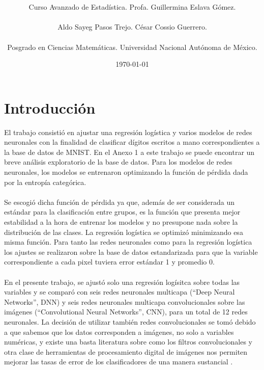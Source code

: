 \documentclass[11pt]{article}
\title{\textbf{\work}}
\author{Curso Avanzado de Estadística. Profa. Guillermina Eslava Gómez.\\ \\ Aldo Sayeg Pasos Trejo. César Cossio Guerrero. \\ \\ Posgrado en Ciencias Matemáticas. Universidad Nacional Autónoma de México. }
\date{\today}
\begin{document}
\maketitle
\section{Introducción}
El trabajo consistió en ajustar una regresión logística y varios modelos de redes neuronales con la finalidad de clasificar dígitos escritos a mano correspondientes a la base de datos de MNIST. En el Anexo 1 a este trabajo se puede encontrar un breve análisis exploratorio de la base de datos. Para los modelos de redes neuronales, los modelos se entrenaron optimizando la función de pérdida dada por la entropía categórica. %
\\
\\Se escogió dicha función de pérdida ya que, además de ser considerada un estándar para la clasificación entre grupos, es la función que presenta mejor estabilidad a la hora de entrenar los modelos y no presupone nada sobre la distribución de las clases. La regresión logística se optimizó minimizando esa misma función. Para tanto las redes neuronales como para la regresión logística los ajustes se realizaron sobre la base de datos estandarizada para que la variable correspondiente a cada pixel tuviera error estándar 1 y promedio 0.
\\
\\En el presente trabajo, se ajustó solo una regresión logísitca sobre todas las variables y se comparó con seis redes neuronales multicapa (``Deep Neural Networks'', DNN) y seis redes neuronales multicapa convolucionales sobre las imágenes (``Convolutional Neural Networks'', CNN), para un total de 12 redes neuronales. La decisión de utilizar también redes convolucionales se tomó debido a que sabemos que los datos corresponden a imágenes, no solo a variables numéricas, y existe una basta literatura sobre como los filtros convolucionales y otra clase de herramientas de procesamiento digital de imágenes nos permiten mejorar las tasas de error de los clasificadores de una manera sustancial \cite{lecunn,Ripley}.
\\
\end{document}
